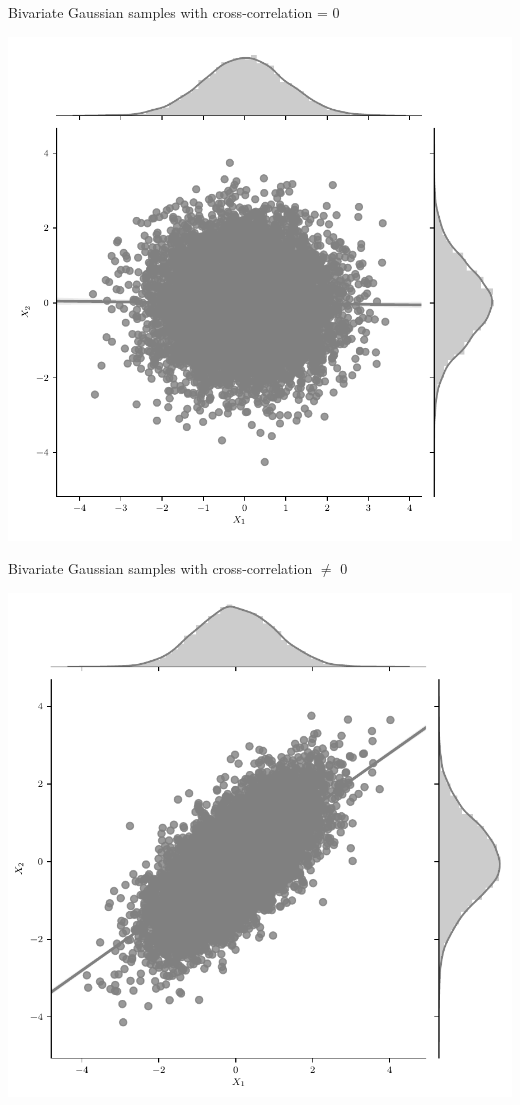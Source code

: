 \documentclass{beamer}
\begin{document}
\begin{frame}{Bivariate Gaussian samples with cross-correlation  = 0}
	\begin{center}
		\includegraphics[width=\linewidth,height=\textheight - 10pt,keepaspectratio]{gp/2d-gp3}
	\end{center}
\end{frame}

\begin{frame}{Bivariate Gaussian samples with cross-correlation  $\neq$ 0}
	\begin{center}
		\includegraphics[width=\linewidth,height=\textheight - 10pt,keepaspectratio]{gp/2d-gp}
	\end{center}
\end{frame}
\end{document}
